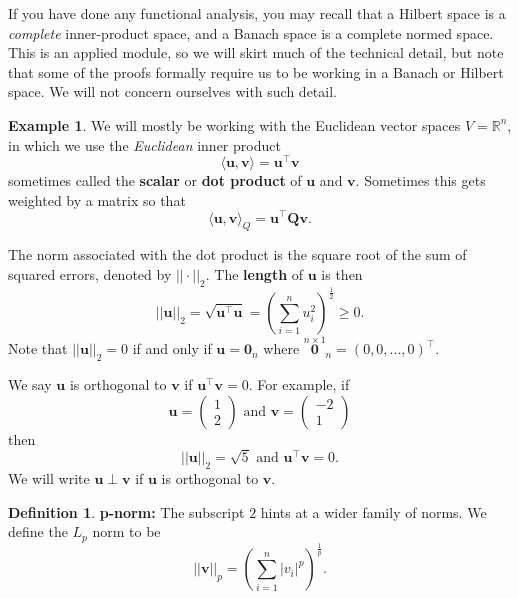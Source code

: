 \documentclass[]{book}
\theoremstyle{definition}
\newtheorem{definition}{Definition}[chapter]
\theoremstyle{definition}
\newtheorem{example}{Example}[chapter]
\theoremstyle{definition}
\theoremstyle{remark}
\begin{document}
If you have done any functional analysis, you may recall that a Hilbert space is a \emph{complete} inner-product space, and a Banach space is a complete normed space. This is an applied module, so we will skirt much of the technical detail, but note that some of the proofs formally require us to be working in a Banach or Hilbert space. We will not concern ourselves with such detail.

\begin{example}
\protect\hypertarget{exm:Rp3}{}{\label{exm:Rp3} }We will mostly be working with the Euclidean vector spaces \(V=\mathbb{R}^n\), in which we use the \emph{Euclidean} inner product
\[\langle \boldsymbol u, \boldsymbol v\rangle = \boldsymbol u^\top \boldsymbol v\]
sometimes called the \textbf{scalar} or \textbf{dot product} of \(\boldsymbol u\) and \(\boldsymbol v\). Sometimes this gets weighted by a matrix so that
\[\langle \boldsymbol u, \boldsymbol v\rangle_Q = \boldsymbol u^\top \boldsymbol Q\boldsymbol v.\]

The norm associated with the dot product is the square root of the sum of squared errors, denoted by \(|| \cdot ||_2\).
The \textbf{length} of \(\boldsymbol u\) is then
\[||\boldsymbol u||_2=\sqrt{\boldsymbol u^\top \boldsymbol u} =\left( \sum_{i=1}^n u_i^2\right)^\frac{1}{2}\geq 0.\]
Note that \(||\boldsymbol u||_2=0\) if and only if \(\boldsymbol u={\mathbf 0}_n\) where \(\stackrel{n\times 1}{\mathbf 0}_n=(0,0,\dots ,0)^\top\).

We say \(\boldsymbol u\) is orthogonal to \(\boldsymbol v\) if \(\boldsymbol u^\top \boldsymbol v=0\).
For example, if
\[\boldsymbol u=\left(\begin{array}{c}1\\2\end{array}\right) \mbox{ and } \boldsymbol v=\left(\begin{array}{c}-2\\1\end{array}\right)\]
then
\[||\boldsymbol u||_2 = \sqrt{5}\mbox{ and } \boldsymbol u^\top \boldsymbol v=0.\]
We will write \(\boldsymbol u\perp \boldsymbol v\) if \(\boldsymbol u\) is orthogonal to \(\boldsymbol v\).
\end{example}

\begin{definition}
\protect\hypertarget{def:pnorms}{}{\label{def:pnorms} }\textbf{p-norm:} The subscript \(2\) hints at a wider family of norms. We define the \(L_p\) norm to be
\[|| \boldsymbol v||_p = \left(\sum_{i=1}^n |v_i|^p\right)^\frac{1}{p}.\]
\end{definition}
\end{document}
